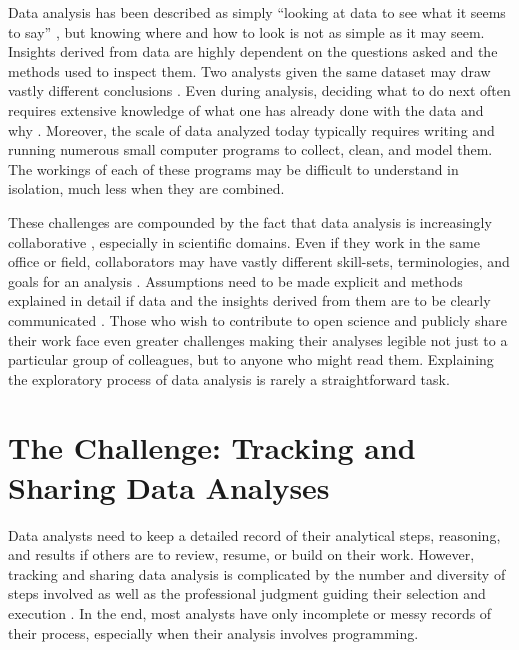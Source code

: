 Data analysis has been described as simply ``looking at data to see what it seems to say'' \cite{tukey1977exploratory}, but knowing where and how to look is not as simple as it may seem. Insights derived from data are highly dependent on the questions asked and the methods used to inspect them. Two analysts given the same dataset may draw vastly different conclusions \cite{herndon2014does, reinhart2010growth}. Even during analysis, deciding what to do next often requires extensive knowledge of what one has already done with the data and why \cite{gotz2009characterizing, heer2012interactive}. Moreover, the scale of data analyzed today typically requires writing and running numerous small computer programs to collect, clean, and model them. The workings of each of these programs may be difficult to understand in isolation, much less when they are combined. 

These challenges are compounded by the fact that
data analysis is increasingly collaborative \cite{heer_design_2008, kandel2012enterprise}, especially in scientific domains. Even if they work in the same office or field, collaborators may have vastly different skill-sets, terminologies, and goals for an analysis \cite{galison1997image}. Assumptions need to be made explicit and methods explained in detail if data and the insights derived from them are to be clearly communicated \cite{harper1995collaborative}. Those who wish to contribute to open science and publicly share their work face even greater challenges making their analyses legible not just to a particular group of colleagues, but to anyone who might read them. Explaining the exploratory process of data analysis is rarely a straightforward task.


\section{The Challenge: Tracking and Sharing Data Analyses}

Data analysts need to keep a detailed record of their analytical steps, reasoning, and results if others are to review, resume, or build on their work.
However, tracking and sharing data analysis is complicated by the number and diversity of steps involved \cite{guo_software_2012, kandel2012enterprise, tabard2008individual} as well as the professional judgment guiding their selection and execution \cite{harper1995collaborative}. 
In the end, most analysts have only incomplete or messy records of their process, especially when their analysis involves programming.


